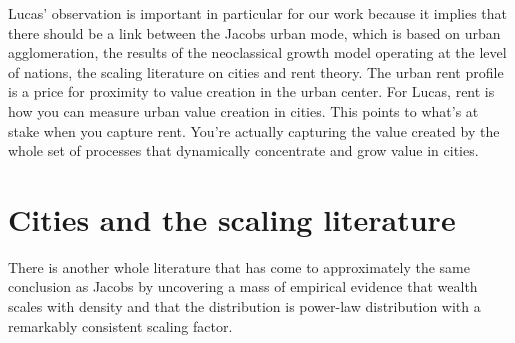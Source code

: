 {Lucas' observation is important in particular for our work because it implies that there should be a link between the Jacobs urban mode, which is based on urban agglomeration,  the results of the neoclassical growth model operating at the level of nations, the scaling literature on cities and rent theory. {\color{red} The urban rent profile is a price for proximity to value creation in the urban center. For Lucas, rent is how you can measure urban value creation in cities. This points to what's at stake when you capture rent.  You're actually capturing the value created by the whole set of processes that dynamically concentrate and grow value in cities. 
}





\section{Cities and the scaling literature}

{\color{red}
There is another whole literature that has come to approximately the same conclusion as Jacobs %
by uncovering a mass of empirical evidence that wealth scales with density and that the distribution is power-law distribution with a remarkably consistent scaling factor. 
} 

}
